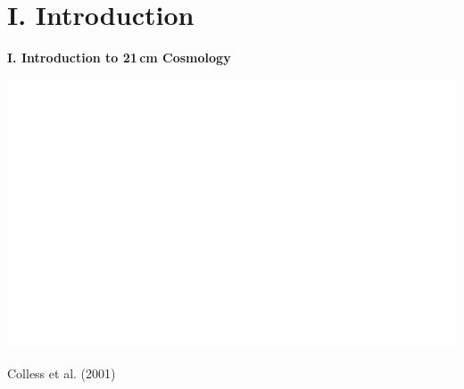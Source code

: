 \documentclass{beamer}
\begin{document}

\section{I. Introduction}

{
    \begin{frame}[t]

        {\large \bfseries I. Introduction to 21\,cm Cosmology}
    \end{frame}
}

\begin{frame}
    \begin{center}
        \includegraphics[width=\textwidth]{figures/2df}
    \end{center}
    \begin{center}
        \tiny{Colless et al. (2001)}
    \end{center}
\end{frame}
\end{document}
